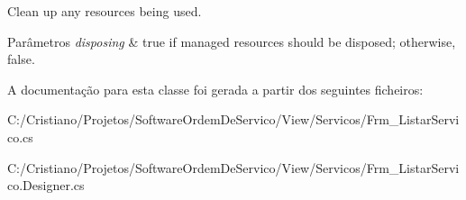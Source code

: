 Clean up any resources being used. 


\begin{DoxyParams}{Parâmetros}
{\em disposing} & true if managed resources should be disposed; otherwise, false.\\
\hline
\end{DoxyParams}


A documentação para esta classe foi gerada a partir dos seguintes ficheiros\+:\begin{DoxyCompactItemize}
\item 
C\+:/\+Cristiano/\+Projetos/\+Software\+Ordem\+De\+Servico/\+View/\+Servicos/Frm\+\_\+\+Listar\+Servico.\+cs\item 
C\+:/\+Cristiano/\+Projetos/\+Software\+Ordem\+De\+Servico/\+View/\+Servicos/Frm\+\_\+\+Listar\+Servico.\+Designer.\+cs\end{DoxyCompactItemize}
